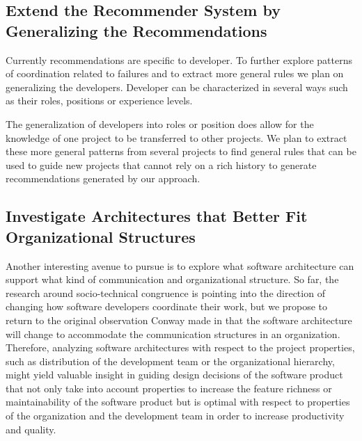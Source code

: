\subsection{Extend the Recommender System by Generalizing the Recommendations}
Currently recommendations are specific to developer.
To further explore patterns of coordination related to failures and to extract more general rules we plan on generalizing the developers.
Developer can be characterized in several ways such as their roles, positions or experience levels.

The generalization of developers into roles or position does allow for the knowledge of one project to be transferred to other projects.
We plan to extract these more general patterns from several projects to find general rules that can be used to guide new projects that cannot rely on a rich history to generate recommendations generated by our approach.

\subsection{Investigate Architectures that Better Fit Organizational Structures}
Another interesting avenue to pursue is to explore what software architecture can support what kind of communication and organizational structure.
So far, the research around socio-technical congruence is pointing into the direction of changing how software developers coordinate their work, but we propose to return to the original observation Conway made in that the software architecture will change to accommodate the communication structures in an organization.
Therefore, analyzing software architectures with respect to the project properties, such as distribution of the development team or the organizational hierarchy, might yield valuable insight in guiding design decisions of the software product that not only take into account properties to increase the feature richness or maintainability of the software product but is optimal with respect to properties of the organization and the development team in order to increase productivity and quality. 
